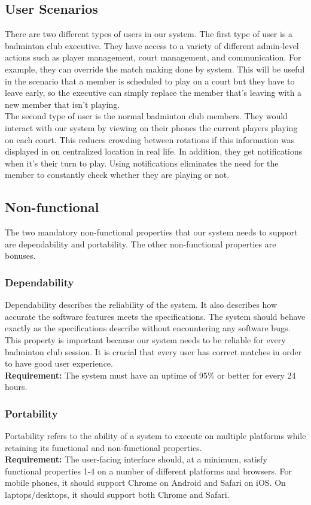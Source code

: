 \documentclass{article}
\begin{document}
\subsection{User Scenarios}
There are two different types of users in our system. The first type of user is
a badminton club executive. They have access to a variety of different admin-level
actions such as player management, court management, and communication.
For example, they can override the match making done by system. This will be useful
in the scenario that a member is scheduled to play on a court but they have to leave
early, so the executive can simply replace the member that's leaving with a new
member that isn't playing. \\

The second type of user is the normal badminton club members. They would interact
with our system by viewing on their phones the current players playing on each court.
This reduces crowding between rotations if this information was displayed in on
centralized location in real life. In addition, they get notifications when
it's their turn to play. Using notifications eliminates the need for the member
to constantly check whether they are playing or not.

\subsection{Non-functional}
The two mandatory non-functional properties that our system needs to support are dependability and portability.
The other non-functional properties are bonuses.

\subsubsection{Dependability}
Dependability describes the reliability of the system.
It also describes how accurate the software features meets the specifications.
The system should behave exactly as the specifications describe without encountering any software bugs.
This property is important because our system needs to be reliable for every badminton club session.
It is crucial that every user has correct matches in order to have good user experience. \\
\textbf{Requirement:} The system must have an uptime of 95\% or better for every 24 hours.

\subsubsection{Portability}
Portability refers to the ability of a system to execute on multiple platforms while
retaining its functional and non-functional properties. \\
\textbf{Requirement:} The user-facing interface should, at a minimum, satisfy functional properties 1-4 on
a number of different platforms and browsers. For mobile phones, it should support Chrome on Android and Safari on iOS.
On laptops/desktops, it should support both Chrome and Safari.
\end{document}
